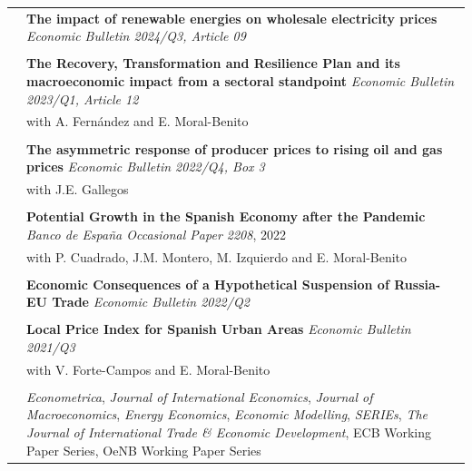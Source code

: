 \documentclass[letterpaper, 11pt]{article}
\begin{document}
\begin{longtable}{p{1.3in}p{4.8in}}
& \textbf{The impact of renewable energies on wholesale electricity prices} \textit{Economic Bulletin 2024/Q3, Article 09} \\
& \\
& \textbf{The Recovery, Transformation and Resilience Plan and its macroeconomic impact from a sectoral standpoint} \textit{Economic Bulletin 2023/Q1, Article 12} \\
& with A. Fernández and E. Moral-Benito \\
& \\
& \textbf{The asymmetric response of producer prices to rising oil and gas prices} \textit{Economic Bulletin 2022/Q4, Box 3} \\
& with J.E. Gallegos \\
& \\
& \textbf{Potential Growth in the Spanish Economy after the Pandemic} \textit{Banco de España Occasional Paper 2208}, 2022 \\
& with P. Cuadrado, J.M. Montero, M. Izquierdo and E. Moral-Benito \\
& \\
& \textbf{Economic Consequences of a Hypothetical Suspension of Russia-EU Trade} \textit{Economic Bulletin 2022/Q2} \\
& \\
& \textbf{Local Price Index for Spanish Urban Areas} \textit{Economic Bulletin 2021/Q3} \\
& with V. Forte-Campos and E. Moral-Benito \\
& \\
\nohyphens{\color{OliveGreen}{Refereeing}}
& \textit{Econometrica}, \textit{Journal of International Economics}, \textit{Journal of Macroeconomics}, \textit{Energy Economics}, \textit{Economic Modelling}, \textit{SERIEs}, \textit{The Journal of International Trade \& Economic Development}, ECB Working Paper Series, OeNB Working Paper Series \\

\end{longtable}
\end{document}
